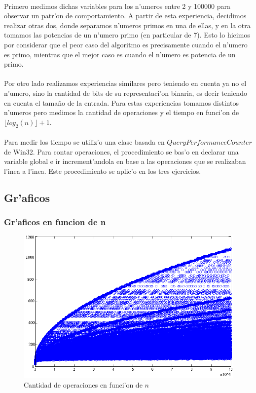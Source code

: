 \paragraph{}
Primero medimos dichas variables para los n'umeros entre 2 y 100000 para observar un patr'on de comportamiento. 
A partir de esta experiencia, decidimos realizar otras dos, donde separamos n'umeros primos en una de ellas, y en 
la otra tomamos las potencias de un n'umero primo (en particular de 7). Esto lo hicimos por considerar que el peor caso
del algoritmo es precisamente cuando el n'umero es primo, mientras que el mejor caso es cuando el n'umero es 
potencia de un primo. 
\paragraph{}
Por otro lado realizamos experiencias similares pero teniendo en cuenta ya no el n'umero, sino la cantidad de bits 
de su representaci'on binaria, es decir teniendo en cuenta el tama\~{n}o de la entrada. Para estas experiencias 
tomamos distintos n'umeros pero medimos la cantidad de operaciones y el tiempo en funci'on de $\lfloor log_2(n) \rfloor + 1$.
\paragraph{}
Para medir los tiempo se utiliz'o una clase basada en $QueryPerformanceCounter$ de Win32. Para contar operaciones, 
el procedimiento se bas'o en declarar una variable global e ir increment'andola en base a las operaciones que se 
realizaban l'inea a l'inea. Este procedimiento se aplic'o en los tres ejercicios.

\subsection{Gr'aficos}
\subsubsection{Gr'aficos en funcion de n}

\begin{figure}[H]
\centering
\includegraphics[scale=0.7]{../../codigo/ejercicio1/benchmark/graficos/todos_los_numeros/graficosTodos.png}
\caption{Cantidad de operaciones en funci'on de $n$}
\label{Ej1fig1}
\end{figure}

